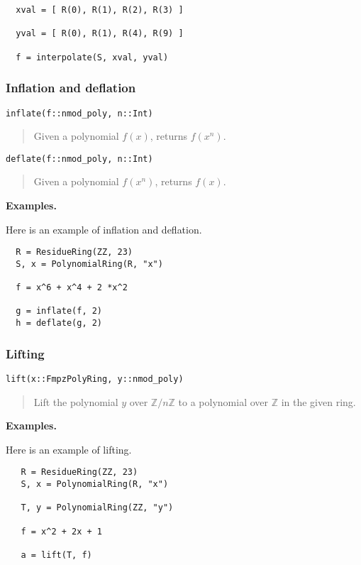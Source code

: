 \documentclass[a4paper,10pt]{article}
\newcommand{\Z}{\mathbb{Z}}
\newcommand{\desc}[1]{\vspace{-3mm}\begin{quote}#1\end{quote}}
\begin{document}
{{\begin{lstlisting}
  xval = [ R(0), R(1), R(2), R(3) ]

  yval = [ R(0), R(1), R(4), R(9) ] 

  f = interpolate(S, xval, yval)
\end{lstlisting}

\subsubsection{Inflation and deflation}

\begin{lstlisting}
inflate(f::nmod_poly, n::Int)
\end{lstlisting}

\desc{Given a polynomial $f(x)$, returns $f(x^n)$.}

\begin{lstlisting}
deflate(f::nmod_poly, n::Int)
\end{lstlisting}

\desc{Given a polynomial $f(x^n)$, returns $f(x)$.}

\textbf{Examples.}

Here is an example of inflation and deflation.

\begin{lstlisting}
  R = ResidueRing(ZZ, 23)
  S, x = PolynomialRing(R, "x")

  f = x^6 + x^4 + 2 *x^2 

  g = inflate(f, 2)
  h = deflate(g, 2)
\end{lstlisting}

\subsubsection{Lifting}

\begin{lstlisting}
lift(x::FmpzPolyRing, y::nmod_poly)
\end{lstlisting}

\desc{Lift the polynomial $y$ over $\Z/n\Z$ to a polynomial over $\Z$ in the given ring.}

\textbf{Examples.}

Here is an example of lifting.

\begin{lstlisting}
   R = ResidueRing(ZZ, 23)
   S, x = PolynomialRing(R, "x")

   T, y = PolynomialRing(ZZ, "y")

   f = x^2 + 2x + 1

   a = lift(T, f) 
\end{lstlisting}

}}
\end{document}
